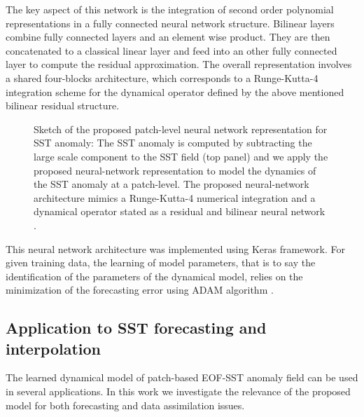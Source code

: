 \documentclass{article}
\def\remRF#1{{\noindent\color{cyan}{{\footnotesize [RF: #1]}}}}
\begin{document}
The key aspect of this network is the integration of second order polynomial representations in a fully connected neural network structure. Bilinear layers combine fully connected layers and an element wise product. They are then concatenated to a classical linear layer and feed into an other fully connected layer to compute the residual approximation. The overall representation involves a shared four-blocks architecture, which corresponds to a Runge-Kutta-4 integration scheme for the dynamical operator defined by the above mentioned bilinear residual structure.

\begin{figure}[htb]

\begin{minipage}[b]{1.0\linewidth}
  \centering
\centerline{}
\caption{Sketch of the proposed patch-level neural network representation for SST anomaly: The SST anomaly is computed by subtracting the large scale component to the SST field (top panel) and we apply the proposed neural-network representation to model the dynamics of the SST anomaly at a patch-level. The proposed neural-network architecture mimics a Runge-Kutta-4 numerical integration and a dynamical operator stated as a residual and bilinear neural network \cite{fablet_bilinear_2017}.}
\label{fig:id_sch}
\end{minipage}
\end{figure}

This neural network architecture was implemented using Keras framework. For given training data, the learning of model parameters, that is to say the identification of the parameters of the dynamical model, relies on the minimization of the forecasting error using ADAM algorithm \cite{kingma_adam:_2014}.

\subsection{Application to SST forecasting and interpolation}

The learned dynamical model of patch-based EOF-SST anomaly field can be used in several applications. In this work we investigate the relevance of the proposed model for both forecasting and data assimilation issues.
\end{document}
